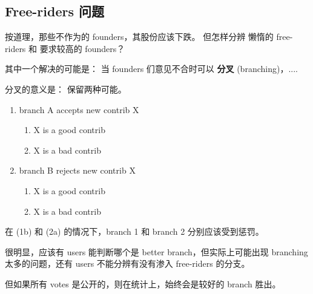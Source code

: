 \documentclass[12pt, orivec, fleqn]{article}
\newcommand{\cc}[2]{#1}
\newcommand{\cc}[2]{#2}
\begin{document}

\secttoc
\subsection{\cc{Free-riders 问题}{The problem of free-riders}}

\cc{
按道理，那些不作为的 founders，其股份应该下跌。  但怎样分辨 懒惰的 free-riders 和 要求较高的 founders？
}{
In principle, if a founder hoards shares without performing useful work, his shares in the company should be reduced.	 But how could we distinguish between lazy free-riders and someone who has high standards for other people's work?
}

\cc{
其中一个解决的可能是： 当 founders 们意见不合时可以 \textbf{分叉} (branching)，....
}{
A possible solution is via \textbf{branching} when founders disagree with each other.
}

\cc{
分叉的意义是： 保留两种可能。 
}{
The essence of branching is:  to preserve both options in a disagreement.
}

\begin{enumerate}
	\item branch A accepts new contrib X
	\begin{enumerate}
		\item X is a good contrib
		\item X is a bad contrib
	\end{enumerate}
	\item branch B rejects new contrib X
	\begin{enumerate}
		\item X is a good contrib
		\item X is a bad contrib
	\end{enumerate}
\end{enumerate}

\cc{
在 (1b) 和 (2a) 的情况下，branch 1 和 branch 2 分别应该受到惩罚。
}{
In cases (1b) and (2a), branch 1 and 2 should be penalized respectively.
}

\cc{
很明显，应该有 users 能判断哪个是 better branch，但实际上可能出现 branching 太多的问题，还有 users 不能分辨有没有渗入 free-riders 的分支。 
}{
Obviously, there should exist users who can determine which branches are better, but in practice there may be too many branches to consider.  Users may be unable to tell which branches are contaminated with free-riders. 
}

\cc{
但如果所有 votes 是公开的，则在统计上，始终会是较好的 branch 胜出。 
}{
However, if all votes are openly visible, then statistically we may believe that good branches will win out eventually.	
}
\end{document}
